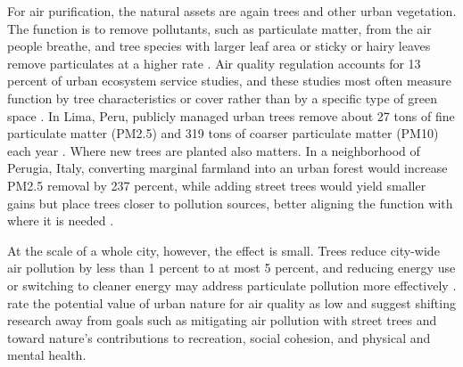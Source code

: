 \documentclass[12pt]{article}
\begin{document}
For air purification, the natural assets are again trees and other urban vegetation. The function is to remove pollutants, such as particulate matter, from the air people breathe, and tree species with larger leaf area or sticky or hairy leaves remove particulates at a higher rate \citep{keelerSocialecologicalTechnologicalFactors2019}. Air quality regulation accounts for 13 percent of urban ecosystem service studies, and these studies most often measure function by tree characteristics or cover rather than by a specific type of green space \citep{veerkampReviewStudiesAssessing2021}. In Lima, Peru, publicly managed urban trees remove about 27 tons of fine particulate matter (PM2.5) and 319 tons of coarser particulate matter (PM10) each year \citep{morenoContributionUrbanTrees2024}. Where new trees are planted also matters. In a neighborhood of Perugia, Italy, converting marginal farmland into an urban forest would increase PM2.5 removal by 237 percent, while adding street trees would yield smaller gains but place trees closer to pollution sources, better aligning the function with where it is needed \citep{menconiOptimizingLocalRegulating2026}.

At the scale of a whole city, however, the effect is small. Trees reduce city-wide air pollution by less than 1 percent to at most 5 percent, and reducing energy use or switching to cleaner energy may address particulate pollution more effectively \citep{keelerSocialecologicalTechnologicalFactors2019}. \citet{keelerSocialecologicalTechnologicalFactors2019} rate the potential value of urban nature for air quality as low and suggest shifting research away from goals such as mitigating air pollution with street trees and toward nature's contributions to recreation, social cohesion, and physical and mental health.
\end{document}
